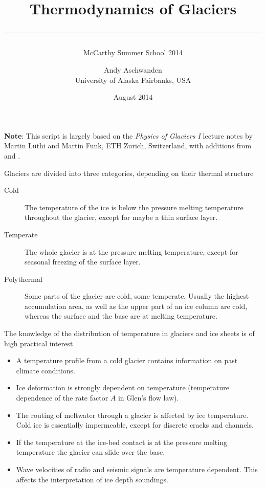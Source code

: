\documentclass[parskip=half]{scrartcl}
\begin{document}
\title{Thermodynamics of Glaciers\\[.5em]
\rule[1.em]{\textwidth}{2pt}}
\subtitle{McCarthy Summer School 2014}

\date{August 2014}

\author{
  \small Andy Aschwanden\\[-.5em] 
 \small University of Alaska Fairbanks, USA}


\maketitle

{\bf Note}: This script is largely based on the \emph{Physics of Glaciers I} lecture notes by Martin L\"uthi and Martin Funk, ETH Zurich, Switzerland, with additions from \cite{GreveBlatter_disg} and \cite{Gusmeroli2010}.

\vspace{1em}

Glaciers are divided into three categories, depending on their thermal
structure
%
\begin{description}
\item[Cold] The temperature of the ice is below the pressure melting temperature
 throughout the glacier, except for maybe a thin surface layer.
\item[Temperate] The whole glacier is at the pressure melting temperature, except
 for seasonal freezing of the surface layer.
\item[Polythermal] Some parts of the glacier are cold, some temperate.
 Usually the highest accumulation area, as well as the upper part of an ice
 column are cold, whereas the surface and the base are at melting
 temperature.
\end{description}
%
The knowledge of the distribution of temperature in glaciers and ice sheets is
of high practical interest
%
\begin{itemize}\itemsep0ex
\item A temperature profile from a cold glacier contains information on past
 climate conditions.
\item Ice deformation is strongly dependent on temperature (temperature
 dependence of the rate factor $A$ in Glen's flow law).
\item The routing of meltwater through a glacier is affected by ice
 temperature.  Cold ice is essentially impermeable, except for discrete
 cracks and channels.
\item If the temperature at the ice-bed contact is at the pressure melting
 temperature the glacier can slide over the base.
\item Wave velocities of radio and seismic signals are temperature
 dependent. This affects the interpretation of ice depth soundings.
\end{itemize}
\end{document}
